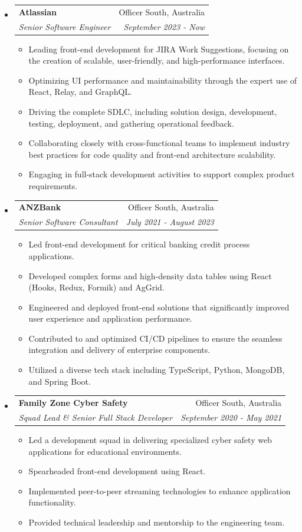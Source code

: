 \documentclass[letterpaper,11pt]{article}
\makeatletter
\newcommand{\resitem}[1]{\item #1 \vspace{-2pt}}
\newcommand{\ressubheading}[4]{
    \begin{tabular*}{6.5in}{p{4.8in}@{\extracolsep{\fill}}r}
            \textbf{#1} & #2 \\
            \textit{#3} & \textit{#4} \\
    \end{tabular*}\vspace{-8pt}}
\makeatother
\begin{document}
      \begin{itemize}
        \item \ressubheading{Atlassian}{Officer South, Australia}{Senior Software Engineer}{September 2023 - Now}
        \begin{itemize}
            \resitem{Leading front-end development for JIRA Work Suggestions, focusing on the creation of scalable, user-friendly, and high-performance interfaces.}
            \resitem{Optimizing UI performance and maintainability through the expert use of React, Relay, and GraphQL.}
            \resitem{Driving the complete SDLC, including solution design, development, testing, deployment, and gathering operational feedback.}
            \resitem{Collaborating closely with cross-functional teams to implement industry best practices for code quality and front-end architecture scalability.}
            \resitem{Engaging in full-stack development activities to support complex product requirements.}
        \end{itemize}
        \item \ressubheading{ANZBank}{Officer South, Australia}{Senior Software Consultant}{July 2021 - August 2023}
        \begin{itemize}
            \resitem{Led front-end development for critical banking credit process applications.}
            \resitem{Developed complex forms and high-density data tables using React (Hooks, Redux, Formik) and AgGrid.}
            \resitem{Engineered and deployed front-end solutions that significantly improved user experience and application performance.}
            \resitem{Contributed to and optimized CI/CD pipelines to ensure the seamless integration and delivery of enterprise components.}
            \resitem{Utilized a diverse tech stack including TypeScript, Python, MongoDB, and Spring Boot.}
        \end{itemize}
        \item \ressubheading{Family Zone Cyber Safety}{Officer South, Australia}{Squad Lead \& Senior Full Stack Developer}{September 2020 - May 2021}
        \begin{itemize}
            \resitem{Led a development squad in delivering specialized cyber safety web applications for educational environments.}
            \resitem{Spearheaded front-end development using React.}
            \resitem{Implemented peer-to-peer streaming technologies to enhance application functionality.}
            \resitem{Provided technical leadership and mentorship to the engineering team.}
        \end{itemize}

\end{itemize}
\end{document}
